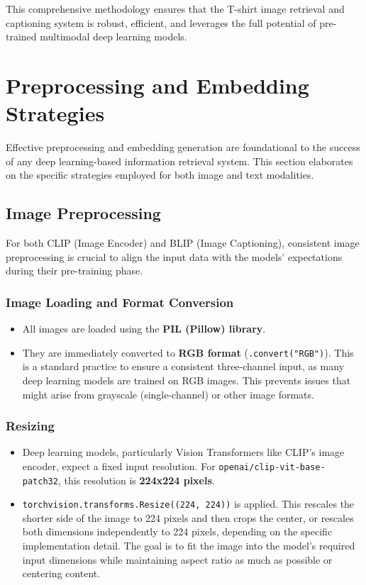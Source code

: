 \documentclass{article}
\begin{document}
This comprehensive methodology ensures that the T-shirt image retrieval and captioning system is robust, efficient, and leverages the full potential of pre-trained multimodal deep learning models.

\section{Preprocessing and Embedding Strategies}
\label{sec:preprocessing}


Effective preprocessing and embedding generation are foundational to the success of any deep learning-based information retrieval system. This section elaborates on the specific strategies employed for both image and text modalities.

\subsection{Image Preprocessing}
For both CLIP (Image Encoder) and BLIP (Image Captioning), consistent image preprocessing is crucial to align the input data with the models' expectations during their pre-training phase.

\subsubsection{Image Loading and Format Conversion}
\begin{itemize}
    \item All images are loaded using the \textbf{PIL (Pillow) library}.
    \item They are immediately converted to \textbf{RGB format} (\texttt{.convert("RGB")}). This is a standard practice to ensure a consistent three-channel input, as many deep learning models are trained on RGB images. This prevents issues that might arise from grayscale (single-channel) or other image formats.
\end{itemize}

\subsubsection{Resizing}
\begin{itemize}
    \item Deep learning models, particularly Vision Transformers like CLIP's image encoder, expect a fixed input resolution. For \texttt{openai/clip-vit-base-patch32}, this resolution is \textbf{224x224 pixels}.
    \item \texttt{torchvision.transforms.Resize((224, 224))} is applied. This rescales the shorter side of the image to 224 pixels and then crops the center, or rescales both dimensions independently to 224 pixels, depending on the specific implementation detail. The goal is to fit the image into the model's required input dimensions while maintaining aspect ratio as much as possible or centering content.
\end{itemize}
\end{document}
